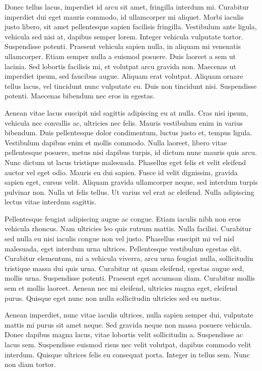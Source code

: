 Donec tellus lacus, imperdiet id arcu sit amet, fringilla interdum mi. Curabitur imperdiet dui eget mauris commodo, id ullamcorper mi aliquet. Morbi iaculis justo libero, sit amet pellentesque sapien facilisis fringilla. Vestibulum ante ligula, vehicula sed nisi at, dapibus semper lorem. Integer vehicula vulputate tortor. Suspendisse potenti. Praesent vehicula sapien nulla, in aliquam mi venenatis ullamcorper. Etiam semper nulla a euismod posuere. Duis laoreet a sem ut lacinia. Sed lobortis facilisis mi, et volutpat arcu gravida non. Maecenas ut imperdiet ipsum, sed faucibus augue. Aliquam erat volutpat. Aliquam ornare tellus lacus, vel tincidunt nunc vulputate eu. Duis non tincidunt nisi. Suspendisse potenti. Maecenas bibendum nec eros in egestas.

Aenean vitae lacus suscipit nisl sagittis adipiscing eu at nulla. Cras nisi ipsum, vehicula nec convallis ac, ultricies nec felis. Mauris vestibulum enim in varius bibendum. Duis pellentesque dolor condimentum, luctus justo et, tempus ligula. Vestibulum dapibus enim et mollis commodo. Nulla laoreet, libero vitae pellentesque posuere, metus nisi dapibus turpis, id dictum nunc mauris quis arcu. Nunc dictum ut lacus tristique malesuada. Phasellus eget felis et velit eleifend auctor vel eget odio. Mauris eu dui sapien. Fusce id velit dignissim, gravida sapien eget, cursus velit. Aliquam gravida ullamcorper neque, sed interdum turpis pulvinar non. Nulla ut felis tellus. Ut varius vel erat ac eleifend. Nulla adipiscing lectus vitae interdum sagittis.

Pellentesque feugiat adipiscing augue ac congue. Etiam iaculis nibh non eros vehicula rhoncus. Nam ultricies leo quis rutrum mattis. Nulla facilisi. Curabitur sed nulla eu nisi iaculis congue non vel justo. Phasellus suscipit mi vel nisl malesuada, eget interdum urna ultrices. Pellentesque vestibulum egestas elit. Curabitur elementum, mi a vehicula viverra, arcu urna feugiat nulla, sollicitudin tristique massa dui quis urna. Curabitur ut quam eleifend, egestas augue sed, mollis urna. Suspendisse potenti. Praesent eget accumsan diam. Curabitur mollis sem et mollis laoreet. Aenean nec mi eleifend, ultricies magna eget, eleifend purus. Quisque eget nunc non nulla sollicitudin ultricies sed eu metus.

Aenean imperdiet, nunc vitae iaculis ultrices, nulla sapien semper dui, vulputate mattis mi purus sit amet neque. Sed gravida neque non massa posuere vehicula. Donec dapibus magna lacus, vitae lobortis velit sollicitudin a. Suspendisse ac lacus sem. Suspendisse euismod risus nec velit volutpat, dapibus commodo velit interdum. Quisque ultrices felis eu consequat porta. Integer in tellus sem. Nunc non diam tortor.

